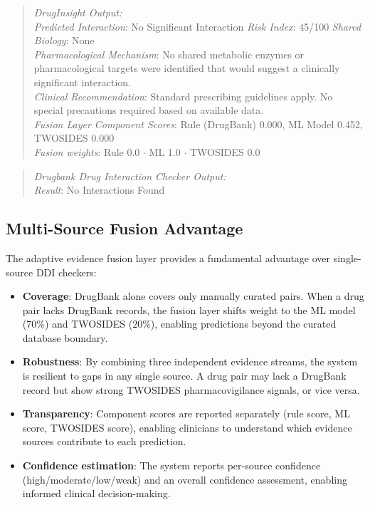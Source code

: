 \documentclass[conference]{IEEEtran}
\begin{document}
\begin{quote}
\textit{DrugInsight Output:}\\
\textit{Predicted Interaction}: No Significant Interaction \newline\quad \textit{Risk Index}: 45/100\newline
\quad \textit{Shared Biology}: None\\ \newline
\textit{Pharmacological Mechanism}: No shared metabolic enzymes or pharmacological targets were identified that would suggest a clinically significant interaction. \\ \newline
\textit{Clinical Recommendation}: Standard prescribing guidelines apply. No special precautions required based on available data.\\ \newline
\textit{Fusion Layer Component Scores}: Rule (DrugBank) 0.000, ML Model 0.452, TWOSIDES 0.000\\ \newline
\textit{Fusion weights}: Rule 0.0 $\cdot$ ML 1.0 $\cdot$ TWOSIDES 0.0
\end{quote}

\begin{quote}
\textit{Drugbank Drug Interaction Checker Output:}\\
\quad \textit{Result}: No Interactions Found \cite{drugbankchecker}\\
\end{quote}

\subsection{Multi-Source Fusion Advantage}
The adaptive evidence fusion layer provides a fundamental advantage over single-source DDI checkers:

\begin{itemize}
    \item \textbf{Coverage}: DrugBank alone covers only manually curated pairs. When a drug pair lacks DrugBank records, the fusion layer shifts weight to the ML model (70\%) and TWOSIDES (20\%), enabling predictions beyond the curated database boundary.
    \item \textbf{Robustness}: By combining three independent evidence streams, the system is resilient to gaps in any single source. A drug pair may lack a DrugBank record but show strong TWOSIDES pharmacovigilance signals, or vice versa.
    \item \textbf{Transparency}: Component scores are reported separately (rule score, ML score, TWOSIDES score), enabling clinicians to understand which evidence sources contribute to each prediction.
    \item \textbf{Confidence estimation}: The system reports per-source confidence (high/moderate/low/weak) and an overall confidence assessment, enabling informed clinical decision-making.
\end{itemize}
\end{document}
